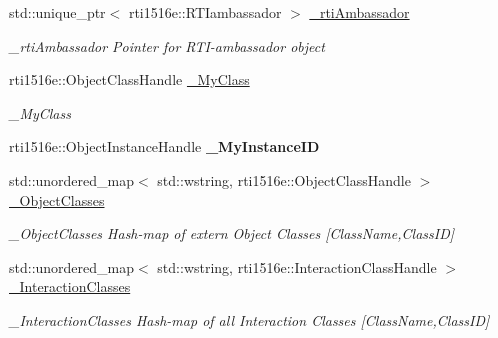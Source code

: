 \begin{DoxyCompactItemize}
\mbox{\label{classUPIM_1_1UPIMFederate_a999bfcb39f6c7aac8c36d13eeb876e3e}} 
std\+::unique\+\_\+ptr$<$ rti1516e\+::\+R\+T\+Iambassador $>$ \hyperlink{classUPIM_1_1UPIMFederate_a999bfcb39f6c7aac8c36d13eeb876e3e}{\+\_\+rti\+Ambassador}
\begin{DoxyCompactList}\small\item\em \+\_\+rti\+Ambassador Pointer for R\+T\+I-\/ambassador object \end{DoxyCompactList}\item 
rti1516e\+::\+Object\+Class\+Handle \hyperlink{classUPIM_1_1UPIMFederate_a16fe60a89ccb9eb131690f6d9649bf9e}{\+\_\+\+My\+Class}
\begin{DoxyCompactList}\small\item\em \+\_\+\+My\+Class \end{DoxyCompactList}\item 
\mbox{\label{classUPIM_1_1UPIMFederate_ac3cfbede2f7c573958f45265f82457d9}} 
rti1516e\+::\+Object\+Instance\+Handle {\bfseries \+\_\+\+My\+Instance\+ID}
\item 
\mbox{\label{classUPIM_1_1UPIMFederate_ab4d53859b19cf731b2bd843d7acd37e7}} 
std\+::unordered\+\_\+map$<$ std\+::wstring, rti1516e\+::\+Object\+Class\+Handle $>$ \hyperlink{classUPIM_1_1UPIMFederate_ab4d53859b19cf731b2bd843d7acd37e7}{\+\_\+\+Object\+Classes}
\begin{DoxyCompactList}\small\item\em \+\_\+\+Object\+Classes Hash-\/map of extern Object Classes \mbox{[}Class\+Name,Class\+ID\mbox{]} \end{DoxyCompactList}\item 
\mbox{\label{classUPIM_1_1UPIMFederate_afdb22cbe29fc81e0db589087efc6fd89}} 
std\+::unordered\+\_\+map$<$ std\+::wstring, rti1516e\+::\+Interaction\+Class\+Handle $>$ \hyperlink{classUPIM_1_1UPIMFederate_afdb22cbe29fc81e0db589087efc6fd89}{\+\_\+\+Interaction\+Classes}
\begin{DoxyCompactList}\small\item\em \+\_\+\+Interaction\+Classes Hash-\/map of all Interaction Classes \mbox{[}Class\+Name,Class\+ID\mbox{]} \end{DoxyCompactList}\item 
\mbox{\label{classUPIM_1_1UPIMFederate_a091bc55d16ccbd8cde510a663a73e8e3}} 

\end{DoxyCompactItemize}
